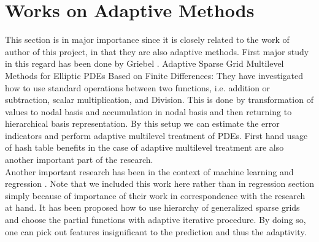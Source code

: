 \section{Works on Adaptive Methods}
This section is in major importance since it is closely related to the work of author of this project, in that they are also adaptive methods. First major study in this regard has been done by Griebel \cite{Griebel1998}.
Adaptive Sparse Grid Multilevel Methods for Elliptic PDEs Based on Finite Differences: They have investigated how to use standard operations between two functions, i.e. addition or subtraction, scalar multiplication, and Division. This is done by transformation of values to nodal basis and accumulation in nodal basis and then returning to hierarchical basis representation. By this setup we can estimate the error indicators and perform adaptive multilevel treatment of PDEs. First hand usage of hash table benefits in the case of adaptive multilevel treatment are also another important part of the research\cite{Griebel1998}.\\
Another important research has been in the context of machine learning and regression \cite{Garcke2007a}. Note that we included this work here rather than in regression section simply because of importance of their work in correspondence with the research at hand. It has been proposed how to use hierarchy of generalized sparse grids and choose the partial functions with adaptive iterative procedure. By doing so, one can pick out features insignificant to the prediction and thus the adaptivity.



